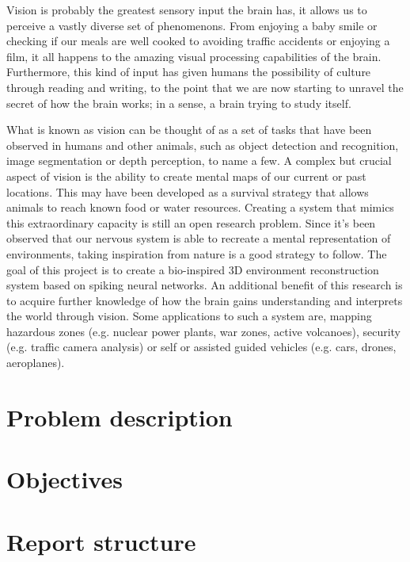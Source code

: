 Vision is probably the greatest sensory input the brain has, it allows us to perceive a vastly diverse set of phenomenons. From enjoying a baby smile or checking if our meals are well cooked to avoiding traffic accidents or enjoying a film, it all happens to the amazing visual processing capabilities of the brain. Furthermore, this kind of input has given humans the possibility of culture through reading and writing, to the point that we are now starting to unravel the secret of how the brain works; in a sense, a brain trying to study itself.

What is known as vision can be thought of as a set of tasks that have been observed in humans and other animals, such as object detection and recognition, image segmentation or depth perception, to name a few. A complex but crucial aspect of vision is the ability to create mental maps of our current or past locations. This may have been developed as a survival strategy that allows animals to reach known food or water resources. Creating a system that mimics this extraordinary capacity is still an open research problem. Since it's been observed that our nervous system is able to recreate a mental representation of  environments, taking inspiration from nature is a good strategy to follow. The goal of this project is to create a bio-inspired 3D environment reconstruction system based on spiking neural networks. An additional benefit of this research is to acquire further knowledge of how the brain gains understanding and interprets the world through vision. Some applications to such a system are, mapping hazardous zones (e.g. nuclear power plants, war zones, active volcanoes), security (e.g. traffic camera analysis) or self or assisted guided vehicles (e.g. cars, drones, aeroplanes).

\section{Problem description}
\label{sec:intro:problem}


\section{Objectives}
\label{sec:intro:objectives}

%

\section{Report structure}
\label{sec:intro:structure}
